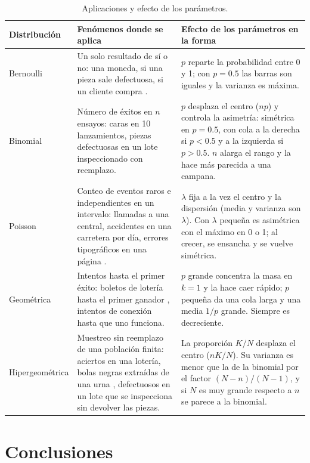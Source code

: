 \documentclass[11pt,letterpaper]{article}
\begin{document}
\begin{table}[htbp]
\centering
\caption{Aplicaciones y efecto de los parámetros.}
\label{tab:aplicaciones}
\footnotesize
\renewcommand{\arraystretch}{1.3}
\begin{tabular}{p{2.4cm}p{4.8cm}p{6.2cm}}
\hline
\textbf{Distribución} & \textbf{Fenómenos donde se aplica} & \textbf{Efecto de los parámetros en la forma} \\
\hline
Bernoulli & Un solo resultado de sí o no: una moneda, si una pieza sale defectuosa, si un cliente compra \parencite{tecnm2026_documento_fuente}. & $p$ reparte la probabilidad entre 0 y 1; con $p = 0.5$ las barras son iguales y la varianza es máxima. \\
Binomial & Número de éxitos en $n$ ensayos: caras en 10 lanzamientos, piezas defectuosas en un lote inspeccionado con reemplazo. & $p$ desplaza el centro ($np$) y controla la asimetría: simétrica en $p = 0.5$, con cola a la derecha si $p < 0.5$ y a la izquierda si $p > 0.5$. $n$ alarga el rango y la hace más parecida a una campana. \\
Poisson & Conteo de eventos raros e independientes en un intervalo: llamadas a una central, accidentes en una carretera por día, errores tipográficos en una página \parencite{tecnm2026_documento_fuente}. & $\lambda$ fija a la vez el centro y la dispersión (media y varianza son $\lambda$). Con $\lambda$ pequeña es asimétrica con el máximo en 0 o 1; al crecer, se ensancha y se vuelve simétrica. \\
Geométrica & Intentos hasta el primer éxito: boletos de lotería hasta el primer ganador \parencite{tecnm2026_documento_fuente}, intentos de conexión hasta que uno funciona. & $p$ grande concentra la masa en $k = 1$ y la hace caer rápido; $p$ pequeña da una cola larga y una media $1/p$ grande. Siempre es decreciente. \\
Hipergeométrica & Muestreo sin reemplazo de una población finita: aciertos en una lotería, bolas negras extraídas de una urna \parencite{tecnm2026_documento_fuente}, defectuosos en un lote que se inspecciona sin devolver las piezas. & La proporción $K/N$ desplaza el centro ($nK/N$). Su varianza es menor que la de la binomial por el factor $(N - n)/(N - 1)$, y si $N$ es muy grande respecto a $n$ se parece a la binomial. \\
\hline
\end{tabular}
\end{table}

\section{Conclusiones}
\end{document}
